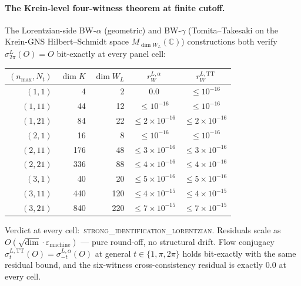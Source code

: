 \documentclass[11pt]{article}
\begin{document}
\paragraph{The Krein-level four-witness theorem at finite cutoff.}
The Lorentzian-side BW-$\alpha$ (geometric) and BW-$\gamma$
(Tomita--Takesaki on the Krein-GNS Hilbert--Schmidt space
$M_{\dim W_L}(\mathbb{C})$) constructions both verify
$\sigma_{2\pi}^L(O) = O$ bit-exactly at every panel cell:

\begin{center}
\begin{tabular}{rrrcc}
\toprule
$(n_{\max}, N_t)$ & $\dim K$ & $\dim W_L$ & $r_W^{L, \alpha}$ & $r_W^{L, \mathrm{TT}}$ \\
\midrule
$(1, 1)$ & 4   & 2   & $0.0$                  & $\le 10^{-16}$ \\
$(1, 11)$ & 44  & 12  & $\le 10^{-16}$         & $\le 10^{-16}$ \\
$(1, 21)$ & 84  & 22  & $\le 2 \times 10^{-16}$ & $\le 2 \times 10^{-16}$ \\
$(2, 1)$  & 16  & 8   & $\le 10^{-16}$         & $\le 10^{-16}$ \\
$(2, 11)$ & 176 & 48  & $\le 3 \times 10^{-16}$ & $\le 3 \times 10^{-16}$ \\
$(2, 21)$ & 336 & 88  & $\le 4 \times 10^{-16}$ & $\le 4 \times 10^{-16}$ \\
$(3, 1)$  & 40  & 20  & $\le 5 \times 10^{-16}$ & $\le 5 \times 10^{-16}$ \\
$(3, 11)$ & 440 & 120 & $\le 4 \times 10^{-15}$ & $\le 4 \times 10^{-15}$ \\
$(3, 21)$ & 840 & 220 & $\le 7 \times 10^{-15}$ & $\le 7 \times 10^{-15}$ \\
\bottomrule
\end{tabular}
\end{center}

Verdict at every cell:\ \textsc{strong\_identification\_lorentzian}.
Residuals scale as $O(\sqrt{\dim} \cdot \varepsilon_{\mathrm{machine}})$
— pure round-off, no structural drift.  Flow conjugacy
$\sigma_t^{L, \mathrm{TT}}(O) = \sigma_{-t}^{L, \alpha}(O)$ at general
$t \in \{1, \pi, 2\pi\}$ holds bit-exactly with the same residual bound,
and the six-witness cross-consistency residual is exactly $0.0$ at
every cell.
\end{document}
